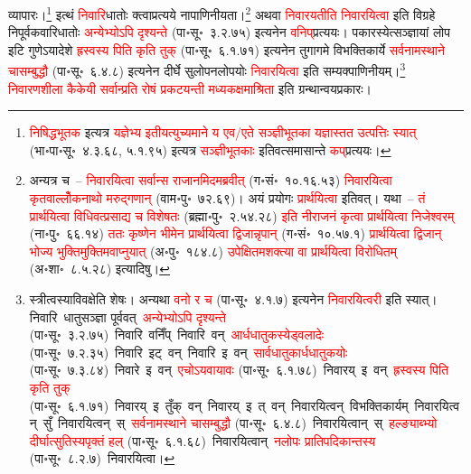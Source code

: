 \begin{sloppypar}
व्यापारः।\footnote{\textcolor{red}{निषिद्ध\-भूतक} इत्यत्र \textcolor{red}{यज्ञेभ्य इतीयत्युच्यमाने य एव/एते सञ्ज्ञीभूतका यज्ञास्तत उत्पत्तिः स्यात्} (भा॰पा॰सू॰~४.३.६८, ५.१.९५) इत्यत्र \textcolor{red}{सञ्ज्ञीभूतकाः} इतिवत्समासान्ते \textcolor{red}{कप्‌}\-प्रत्ययः।} इत्थं \textcolor{red}{निवारि}\-धातोः क्त्वा\-प्रत्यये नापाणिनीयता।\footnote{अन्यत्र च~– \textcolor{red}{निवारयित्वा सर्वान्स राजानमिदमब्रवीत्} (ग॰सं॰~१०.१६.५३) \textcolor{red}{निवारयित्वा कृतवाल्लोँक\-नाथो मरुद्गणान्} (वाम॰पु॰~७२.६९)। अयं प्रयोगः \textcolor{red}{प्रार्थयित्वा} इतिवत्। यथा~– \textcolor{red}{तं प्रार्थयित्वा विधिवत्प्रसाद्य च विशेषतः} (ब्रह्मा॰पु॰~२.५४.२८) \textcolor{red}{इति नीराजनं कृत्वा प्रार्थयित्वा निजेश्वरम्} (ना॰पु॰~६६.१४) \textcolor{red}{ततः कृष्णेन भीमेन प्रार्थयित्वा द्विजान्नृपान्} (ग॰सं॰~१०.५७.१) \textcolor{red}{प्रार्थयित्वा द्विजान् भोज्य भुक्ति\-मुक्तिमवाप्नुयात्} (अ॰पु॰~१८४.८) \textcolor{red}{उपेक्षितमशक्त्या वा प्रार्थयित्वा विरोधितम्} (अ॰शा॰~८.५.२८) इत्यादिषु।} अथवा \textcolor{red}{निवारयतीति निवारयित्वा} इति विग्रहे नि\-पूर्वक\-वारि\-धातोः \textcolor{red}{अन्येभ्योऽपि दृश्यन्ते} (पा॰सू॰~३.२.७५) इत्यनेन \textcolor{red}{वनिप्‌}\-प्रत्ययः। पकारस्येत्सञ्ज्ञायां लोप इटि गुणेऽयादेशे \textcolor{red}{ह्रस्वस्य पिति कृति तुक्} (पा॰सू॰~६.१.७१) इत्यनेन तुगागमे विभक्ति\-कार्ये \textcolor{red}{सर्वनामस्थाने चासम्बुद्धौ} (पा॰सू॰~६.४.८) इत्यनेन दीर्घे सुलोपनलोपयोः \textcolor{red}{निवारयित्वा} इति सम्यक्पाणिनीयम्।\footnote{स्त्रीत्वस्याविवक्षेति शेषः। अन्यथा \textcolor{red}{वनो र च} (पा॰सू॰~४.१.७) इत्यनेन \textcolor{red}{निवारयित्वरी} इति स्यात्। निवारि~\arrow धातु\-सञ्ज्ञा पूर्ववत्~\arrow \textcolor{red}{अन्येभ्योऽपि दृश्यन्ते} (पा॰सू॰~३.२.७५)~\arrow निवारि~वनिँप्~\arrow निवारि~वन्~\arrow \textcolor{red}{आर्धधातुकस्येड्वलादेः} (पा॰सू॰~७.२.३५)~\arrow निवारि~इट्~वन्~\arrow निवारि~इ~वन्~\arrow \textcolor{red}{सार्वधातुकार्ध\-धातुकयोः} (पा॰सू॰~७.३.८४)~\arrow निवारे~इ~वन्~\arrow \textcolor{red}{एचोऽयवायावः} (पा॰सू॰~६.१.७८)~\arrow निवारय्~इ~वन्~\arrow \textcolor{red}{ह्रस्वस्य पिति कृति तुक्} (पा॰सू॰~६.१.७१)~\arrow निवारय्~इ~तुँक्~वन्~\arrow निवारय्~इ~त्~वन्~\arrow निवारयित्वन्~\arrow विभक्ति\-कार्यम्~\arrow निवारयित्वन्~सुँ~\arrow निवारयित्वन्~स्~\arrow \textcolor{red}{सर्वनामस्थाने चासम्बुद्धौ} (पा॰सू॰~६.४.८)~\arrow निवारयित्वान्~स्~\arrow \textcolor{red}{हल्ङ्याब्भ्यो दीर्घात्सुतिस्यपृक्तं हल्} (पा॰सू॰~६.१.६८)~\arrow निवारयित्वान्~\arrow \textcolor{red}{नलोपः प्रातिपदिकान्तस्य} (पा॰सू॰~८.२.७)~\arrow निवारयित्वा।} \textcolor{red}{निवारण\-शीला कैकेयी सर्वान्प्रति रोषं प्रकटयन्ती मध्य\-कक्षमाश्रिता} इति ग्रन्थान्वय\-प्रकारः।\end{sloppypar}
